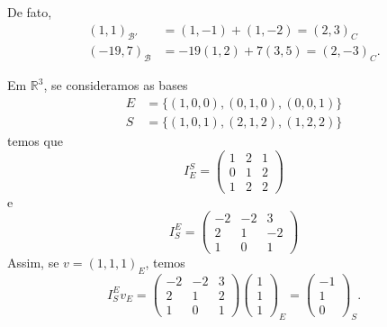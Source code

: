 \begin{exemplo*}
\begin{equation*}
    \end{equation*}
    De fato,
    \begin{align*}
    	(1,1)_{{\mathcal{B}}'} &= (1,-1)+(1,-2) = (2,3)_C\\
        (-19,7)_{\mathcal{B}} &= -19(1,2)+7(3,5) = (2,-3)_C.
    \end{align*}
\end{exemplo*}

\begin{exemplo*}
	Em ${\mathbb{R}}^3$, se consideramos as bases
    \begin{align*}
    	E &= \{ (1,0,0),(0,1,0),(0,0,1)\}\\
        S &= \{ (1,0,1),(2,1,2),(1,2,2)\}
    \end{align*}
    temos que
    \begin{equation*}
    	I_E^S = \begin{pmatrix} 1 & 2 & 1\\0 & 1 & 2\\1& 2 & 2\end{pmatrix}
    \end{equation*}
    e
    \begin{equation*}
    	I_S^E = \begin{pmatrix} -2 & -2 & 3\\2 & 1 & -2\\1 & 0 & 1\end{pmatrix}
    \end{equation*}
    Assim, se $v = (1,1,1)_E$, temos
    \begin{equation*}
    	I_S^E v_E = \begin{pmatrix} -2 & -2 & 3\\2 & 1 & 2\\1 & 0 & 1\end{pmatrix} \begin{pmatrix} 1\\1\\1\end{pmatrix}_E = \begin{pmatrix} -1\\1\\0\end{pmatrix}_S.
    \end{equation*}
\end{exemplo*}

